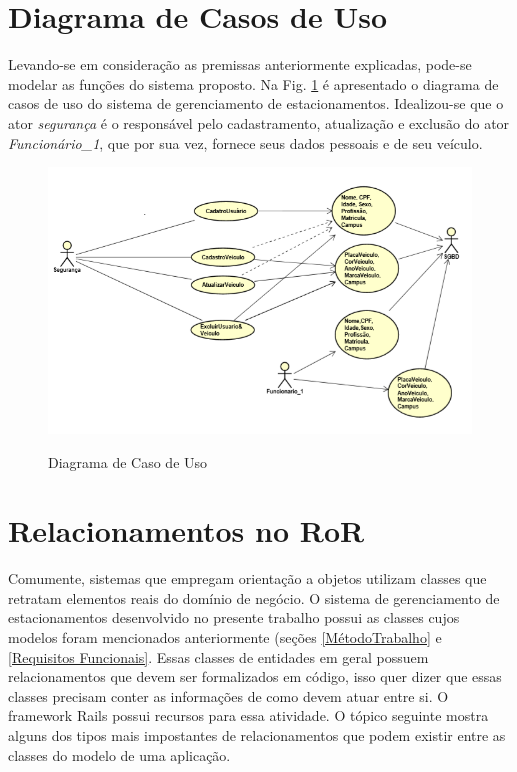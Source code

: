  \section{Diagrama de Casos de Uso}
 
 Levando-se em consideração as premissas anteriormente explicadas, pode-se modelar as funções do sistema proposto. Na Fig. \ref{figura:diagramaCasoUso_proj_vic} é apresentado o diagrama
 de casos de uso do sistema de gerenciamento de estacionamentos. Idealizou-se que o ator \textit{segurança} é o responsável pelo cadastramento, atualização e exclusão do ator \textit{Funcionário\_1}, que por sua vez, fornece seus dados pessoais e de seu veículo. 
 
 \begin{figure}[h]
 	\caption{Diagrama de Caso de Uso}
 	\centering %
 	\includegraphics{Figs/diagramaCasoUso_proj_vic.png} %
 	\label{figura:diagramaCasoUso_proj_vic}
 \end{figure}

\section{Relacionamentos no RoR}
Comumente, sistemas que empregam orientação a objetos utilizam classes que retratam elementos reais do domínio de negócio. O sistema de gerenciamento de estacionamentos desenvolvido no presente trabalho possui as classes cujos modelos foram mencionados anteriormente (seções \ref{MétodoTrabalho} e \ref{Requisitos Funcionais}. Essas classes de entidades em geral possuem relacionamentos que devem ser formalizados em código, isso quer dizer que essas classes precisam conter as informações de como devem atuar entre si. O framework Rails possui recursos para essa atividade. O tópico seguinte mostra alguns dos tipos mais impostantes de relacionamentos que podem existir entre as classes do modelo de uma aplicação.

